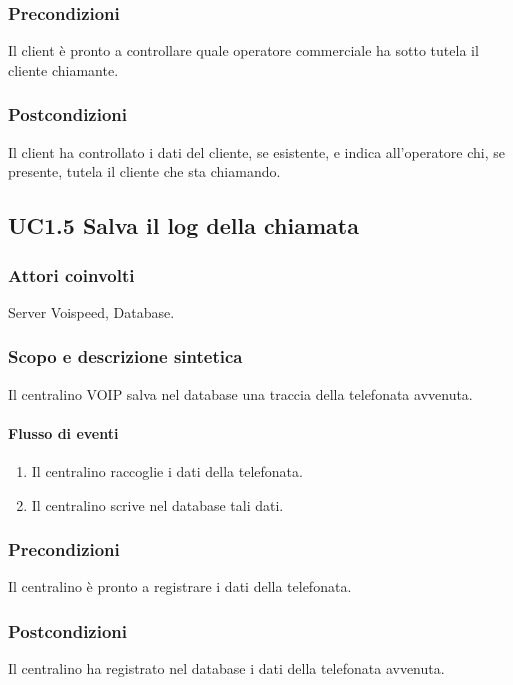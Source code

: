 \subsubsection*{Precondizioni} Il client \`e pronto a controllare quale operatore commerciale ha sotto tutela il cliente chiamante.
\subsubsection*{Postcondizioni} Il client ha controllato i dati del cliente, se esistente, e indica all'operatore chi, se presente, tutela il cliente che sta chiamando.


\subsection*{UC1.5 Salva il log della chiamata}
\subsubsection*{Attori coinvolti} Server Voispeed, Database.
\subsubsection*{Scopo e descrizione sintetica}
Il centralino VOIP salva nel database una traccia della telefonata avvenuta.
\paragraph{Flusso di eventi}
\begin{enumerate}
\item Il centralino raccoglie i dati della telefonata.
\item Il centralino scrive nel database tali dati.
\end{enumerate}
\subsubsection*{Precondizioni} Il centralino \`e pronto a registrare i dati della telefonata.
\subsubsection*{Postcondizioni} Il centralino ha registrato nel database i dati della telefonata avvenuta.


